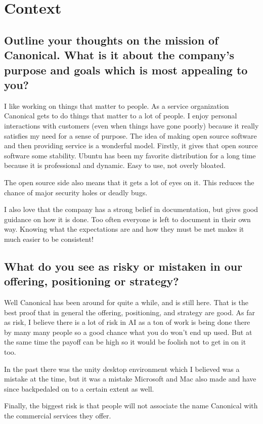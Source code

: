 \documentclass[letter,12pt]{article}
\begin{document}
\section{Context}

\subsection{Outline your thoughts on the mission of Canonical. What is it about the company's purpose and goals which is most appealing to you?}
I like working on things that matter to people. As a service organization Canonical gets to do things that matter to a lot of people. I enjoy personal interactions with customers (even when things have gone poorly) because it really satisfies my need for a sense of purpose. The idea of making open source software and then providing service is a wonderful model. Firstly, it gives that open source software some stability. Ubuntu has been my favorite distribution for a long time because it is professional and dynamic. Easy to use, not overly bloated.

The open source side also means that it gets a lot of eyes on it. This reduces the chance of major security holes or deadly bugs.

I also love that the company has a strong belief in documentation, but gives good guidance on how it is done. Too often everyone is left to document in their own way. Knowing what the expectations are and how they must be met makes it much easier to be consistent!

\subsection{What do you see as risky or mistaken in our offering, positioning or strategy?}
Well Canonical has been around for quite a while, and is still here. That is the best proof that in general the offering, positioning, and strategy are good. As far as risk, I believe there is a lot of risk in AI as a ton of work is being done there by many many people so a good chance what you do won't end up used. But at the same time the payoff can be high so it would be foolish not to get in on it too.

In the past there was the unity desktop environment which I believed was a mistake at the time, but it was a mistake Microsoft and Mac also made and have since backpedaled on to a certain extent as well.

Finally, the biggest risk is that people will not associate the name Canonical with the commercial services they offer.
\end{document}
